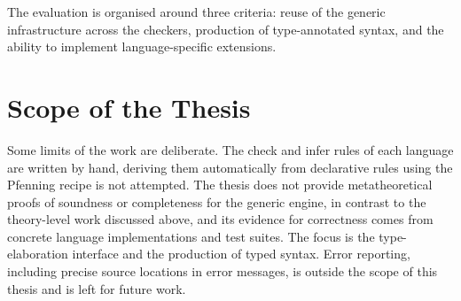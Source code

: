The evaluation is organised around three criteria: reuse of the generic infrastructure across the checkers, production of type-annotated syntax, and the ability to implement language-specific extensions.

\section{Scope of the Thesis}
\label{sec:intro-scope}

Some limits of the work are deliberate. The check and infer rules of each language are written by hand, deriving them automatically from declarative rules using the Pfenning recipe is not attempted. The thesis does not provide metatheoretical proofs of soundness or completeness for the generic engine, in contrast to the theory-level work discussed above, and its evidence for correctness comes from concrete language implementations and test suites. The focus is the type-elaboration interface and the production of typed syntax. Error reporting, including precise source locations in error messages, is outside the scope of this thesis and is left for future work.

